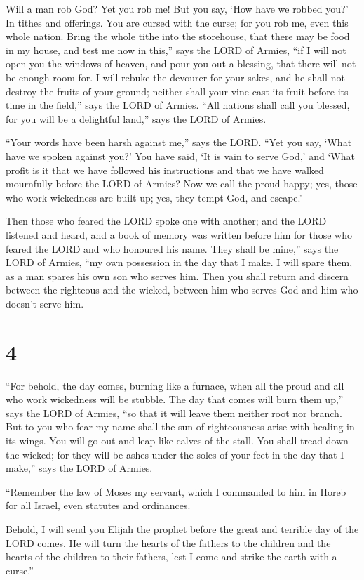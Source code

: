  Will a man rob God? Yet you rob me! But you say, `How have
we robbed you?' In tithes and offerings.  You are cursed
with the curse; for you rob me, even this whole nation. 
Bring the whole tithe into the storehouse, that there may be food in my
house, and test me now in this,'' says the LORD of Armies, ``if I will
not open you the windows of heaven, and pour you out a blessing, that
there will not be enough room for.  I will rebuke the
devourer for your sakes, and he shall not destroy the fruits of your
ground; neither shall your vine cast its fruit before its time in the
field,'' says the LORD of Armies.  ``All nations shall call
you blessed, for you will be a delightful land,'' says the LORD of
Armies.

 ``Your words have been harsh against me,'' says the LORD.
``Yet you say, `What have we spoken against you?'  You have
said, `It is vain to serve God,' and `What profit is it that we have
followed his instructions and that we have walked mournfully before the
LORD of Armies?  Now we call the proud happy; yes, those
who work wickedness are built up; yes, they tempt God, and escape.'

 Then those who feared the LORD spoke one with another; and
the LORD listened and heard, and a book of memory was written before him
for those who feared the LORD and who honoured his name. 
They shall be mine,'' says the LORD of Armies, ``my own possession in
the day that I make. I will spare them, as a man spares his own son who
serves him.  Then you shall return and discern between the
righteous and the wicked, between him who serves God and him who doesn't
serve him.

\hypertarget{section-3}{%
\section{4}\label{section-3}}

 ``For behold, the day comes, burning like a furnace, when
all the proud and all who work wickedness will be stubble. The day that
comes will burn them up,'' says the LORD of Armies, ``so that it will
leave them neither root nor branch.  But to you who fear my
name shall the sun of righteousness arise with healing in its wings. You
will go out and leap like calves of the stall.  You shall
tread down the wicked; for they will be ashes under the soles of your
feet in the day that I make,'' says the LORD of Armies.

 ``Remember the law of Moses my servant, which I commanded
to him in Horeb for all Israel, even statutes and ordinances.

 Behold, I will send you Elijah the prophet before the great
and terrible day of the LORD comes.  He will turn the hearts
of the fathers to the children and the hearts of the children to their
fathers, lest I come and strike the earth with a curse.''
